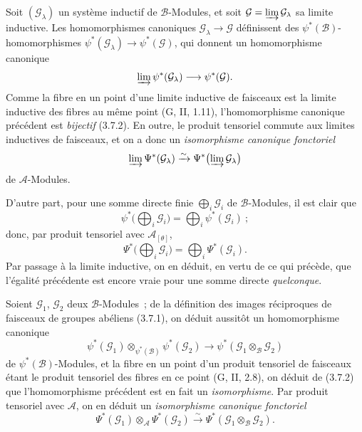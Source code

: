 \begin{env}[4.3.2]
\label{0.4.3.2-fr}
Soit $(\mathcal{G}_\lambda)$ un système inductif de $\mathcal{B}$-Modules, et
soit $\mathcal{G}=\varinjlim\mathcal{G}_\lambda$ sa limite inductive. Les
homomorphismes canoniques $\mathcal{G}_\lambda\to\mathcal{G}$ définissent des
$\psi^*(\mathcal{B})$-homomorphismes
$\psi^*(\mathcal{G}_\lambda)\to\psi^*(\mathcal{G})$, qui donnent un
homomorphisme canonique
\[
  \varinjlim\psi^*(\mathcal{G}_\lambda)
  \longrightarrow
  \psi^*(\mathcal{G}).
\]
Comme la fibre en un point d'une limite inductive de faisceaux est la limite
inductive des fibres au même point (G, II, 1.11), l'homomorphisme canonique
précédent est \emph{bijectif} (3.7.2). En outre, le produit tensoriel commute
aux limites inductives de faisceaux, et on a donc un \emph{isomorphisme
canonique fonctoriel}
\[
  \varinjlim\Psi^*(\mathcal{G}_\lambda)
  \xrightarrow{\sim}
  \Psi^*\bigl(\varinjlim\mathcal{G}_\lambda\bigr)
\]
de $\mathcal{A}$-Modules.

D'autre part, pour une somme directe finie $\bigoplus_i\mathcal{G}_i$ de
$\mathcal{B}$-Modules, il est clair que
\[
  \psi^*\bigl(\bigoplus_i\mathcal{G}_i\bigr)
  =\bigoplus_i\psi^*(\mathcal{G}_i)~;
\]
donc, par produit tensoriel avec $\mathcal{A}_{[\theta]}$,
\[
  \Psi^*\bigl(\bigoplus_i\mathcal{G}_i\bigr)
  =\bigoplus_i\Psi^*(\mathcal{G}_i).
  \tag{4.3.2.1}\label{0.4.3.2.1-fr}
\]
Par passage à la limite inductive, on en déduit, en vertu de ce qui précède,
que l'égalité précédente est encore vraie pour une somme directe
\emph{quelconque}.
\end{env}

\begin{env}[4.3.3]
Soient $\mathcal{G}_1$, $\mathcal{G}_2$ deux $\mathcal{B}$-Modules~; de la
définition des images réciproques de faisceaux de groupes abéliens (3.7.1),
on déduit aussitôt un homomorphisme canonique
\[
  \psi^*(\mathcal{G}_1)\otimes_{\psi^*(\mathcal{B})}\psi^*(\mathcal{G}_2)
  \longrightarrow
  \psi^*(\mathcal{G}_1\otimes_{\mathcal{B}}\mathcal{G}_2)
\]
de $\psi^*(\mathcal{B})$-Modules, et la fibre en un point d'un produit
tensoriel de faisceaux étant le produit tensoriel des fibres en ce point
(G, II, 2.8), on déduit de (3.7.2) que l'homomorphisme précédent est en fait
un \emph{isomorphisme}. Par produit tensoriel avec $\mathcal{A}$, on en déduit
un \emph{isomorphisme canonique fonctoriel}
\[
  \Psi^*(\mathcal{G}_1)\otimes_{\mathcal{A}}\Psi^*(\mathcal{G}_2)
  \xrightarrow{\sim}
  \Psi^*(\mathcal{G}_1\otimes_{\mathcal{B}}\mathcal{G}_2).
  \tag{4.3.3.1}\label{0.4.3.3.1-fr}
\]
\end{env}

